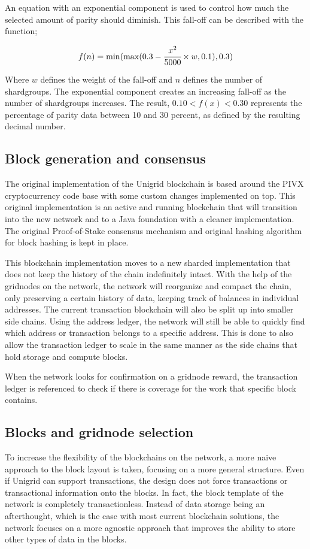 \documentclass[10pt,a4paper,final]{article}
\begin{document}
\noindent An equation with an exponential component is used to control how much the selected amount of parity should diminish. This fall-off can be described with the function;

\[
	\begin{array}{l}
	f(n) = \min(\max(0.3 - \cfrac{x^2}{5000} \times w, 0.1), 0.3)
	\end{array}	
\]

\noindent Where $w$ defines the weight of the fall-off and $n$ defines the number of shardgroups. The exponential component creates an increasing fall-off as the number of \glspl{shardgroup} increases. The result, $0.10 < f(x) < 0.30$ represents the percentage of parity data between 10 and 30 percent, as defined by the resulting decimal number.

\subsection{Block generation and consensus}
The original implementation of the Unigrid blockchain is based around the PIVX cryptocurrency \cite{pivxrepo} code base with some custom changes implemented on top. This original implementation is an active and running blockchain that will transition into the new network and to a Java foundation with a cleaner implementation. The original Proof-of-Stake \cite{sothe2018} consensus mechanism and original hashing algorithm for block hashing is kept in place.

This blockchain implementation moves to a new sharded implementation that does not keep the history of the chain indefinitely intact. With the help of the \glspl{gridnode} on the network, the network will reorganize and compact the chain, only preserving a certain history of data, keeping track of balances in individual addresses. The current transaction blockchain will also be split up into smaller side chains. Using the address ledger, the network will still be able to quickly find which address or transaction belongs to a specific address. This is done to also allow the transaction ledger to scale in the same manner as the side chains that hold storage and compute blocks.

\noindent When the network looks for confirmation on a \gls{gridnode} reward, the transaction ledger is referenced to check if there is coverage for the work that specific block contains.

\subsection{Blocks and \gls{gridnode} selection}
\label{section:blocks}
To increase the flexibility of the blockchains on the network, a more naive approach to the block layout is taken, focusing on a more general structure. Even if Unigrid can support transactions, the design does not force transactions or transactional information onto the blocks. In fact, the block template of the network is completely transactionless. Instead of data storage being an afterthought, which is the case with most current blockchain solutions, the network focuses on a more agnostic approach that improves the ability to store other types of data in the blocks.
\end{document}
